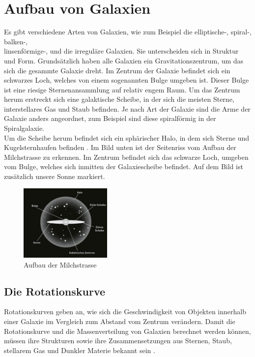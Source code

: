 

\section{Aufbau von Galaxien}
Es gibt verschiedene Arten von Galaxien, wie zum Beispiel die elliptische-, spiral-, balken-,\\ linsenförmige-, und die irreguläre Galaxien. Sie unterscheiden sich in Struktur und Form. 
Grundsätzlich haben alle Galaxien ein Gravitationszentrum, um das sich die gesammte Galaxie dreht. Im Zentrum der Galaxie befindet sich ein schwarzes Loch, welches von einem sogenannten Bulge umgeben ist. 
Dieser Bulge ist eine riesige Sternenansammlung auf relativ engem Raum. Um das Zentrum herum erstreckt sich eine galaktische Scheibe, in der sich die meisten Sterne, interstellares Gas und Staub befinden.
Je nach Art der Galaxie sind die Arme der Galaxie anders angeordnet, zum Beispiel sind diese spiralförmig in der Spiralgalaxie.\\ Um die Scheibe herum befindet sich ein sphärischer Halo, in dem sich Sterne und Kugelsternhaufen befinden \cite{Ribas2020}.  
Im Bild unten ist der Seitenriss vom Aufbau der Milchstrasse zu erkennen. Im Zentrum befindet sich das schwarze Loch, umgeben vom Bulge, welches sich inmitten der Galaxiescheibe befindet. Auf dem Bild ist zusätzlich unsere Sonne markiert.

\begin{figure}[H]
	\centering
	\includegraphics[width=0.4\textwidth]{figures/aufbau_galaxie.jpg}
	\caption[Abbildung 1: Aufbau Milchstrasse]{Aufbau der Milchstrasse \cite{Anderl2023}}
	\label{fig Aufbau Galaxie}
\end{figure}


\subsection{Die Rotationskurve}

Rotationskurven geben an, wie sich die Geschwindigkeit von Objekten innerhalb einer Galaxie im Vergleich zum Abstand vom Zentrum verändern. 
Damit die Rotationskurve und die Massenverteilung von Galaxien berechnet werden können, müssen ihre Strukturen sowie ihre Zusammensetzungen aus Sternen, Staub, stellarem Gas und Dunkler Materie bekannt sein \cite{Moeller2010}. 

